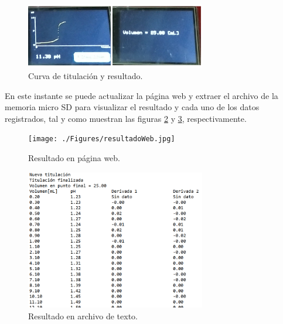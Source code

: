 \begin{figure}[htbp]
	\centering
	\includegraphics[width=0.7\textwidth]{./Figures/casoParte3.png}
	\caption{Curva de titulación y resultado.}
	\label{fig:casoParte3}
\end{figure}

En este instante se puede actualizar la página web y extraer el archivo de la memoria micro SD para visualizar el resultado y cada uno de los datos registrados, tal y como muestran las figuras \ref{fig:resultadoWeb.jpg} y \ref{fig:resultadoSD}, respectivamente.

\begin{figure}[htbp]
	\centering
	\texttt{[image: ./Figures/resultadoWeb.jpg]}
	\caption{Resultado en página web.}
	\label{fig:resultadoWeb.jpg}
\end{figure}

\begin{figure}[htbp]
	\centering
	\includegraphics[width=0.7\textwidth]{./Figures/resultadoSD.png}
	\caption{Resultado en archivo de texto.}
	\label{fig:resultadoSD}
\end{figure}



